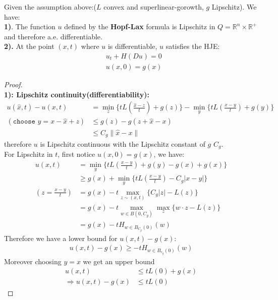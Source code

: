 \begin{theorem} Given the assumption above:($L$ convex and superlinear-gorowth, $g$ Lipschitz). We have:\\
 \textbf{1)}. The function $u$ defined by the \textbf{Hopf-Lax} formula is Lipschitz in $ Q =\mathbb{R}^n \times \mathbb{R}^+$ and therefore a.e. differentiable. \\
\textbf{2).} At the point $(x, t)$ where $u$ is differentiable, $u$ satisfies the HJE:
		\begin{align*}
			&u_t + H(Du) = 0\\
			&u(x, 0) = g(x)
		\end{align*}

\end{theorem}
\begin{proof}\quad\\
	\textbf{1): Lipschitz continuity(differentiability):} 
	\begin{align*}
		u(\hat{x}, t) - u(x, t) &= \min_z \{ t L(\frac{\hat{x} - z}{t}) + g(z)\} - \min_y\{tL(\frac{x - y}{t}) + g(y)\}\\
		(\texttt{choose } y = x - \hat{x} + z)
		&\le g(z) - g(z + \hat{x} - x)\\
		&\le C_g \|\hat{x} - x \|
	\end{align*}
	therefore $u$ is Lipschitz continuous with the Lipschitz constant of $g$ $C_g$.  \\
	For Lipschitz in $t$, first notice $u(x, 0) = g(x)$, we have:
	\begin{align*}
		u(x, t) &= \min_{y}\bigg\{tL(\frac{x - y}{t}) + g(y) - g(x) + g(x) \bigg\}\\
		&\ge  g(x) +  \min_y \bigg\{ tL(\frac{x - y}{t})  -C_g|x - y|\bigg\}\\
		(z = \frac{x - y}{t})
		&= g(x) - t\max_{z \sim (x, t)} \bigg\{ C_g |z| - L(z)\bigg\}\\
		&= g(x) - t\max_{w \in B(0, C_g)} \max_z \{ w \cdot z - L(z)\}\\
		&= g(x) - t H_{w \in B_{C_g}(0)}(w)
	\end{align*}
	Therefore we have a lower bound for $u(x, t) - g(x)$:
	\begin{align*}
		u(x, t) - g(x) \ge -t H_{w \in B_{c_g}(0)} (w)
	\end{align*}
	Moreover choosing $y= x$ we get an upper bound
	\begin{align*}
		u(x, t) &\le  tL(0) + g(x)\\
		\Rightarrow u(x, t) - g(x) &\le t L(0)
	\end{align*}

\end{proof}
